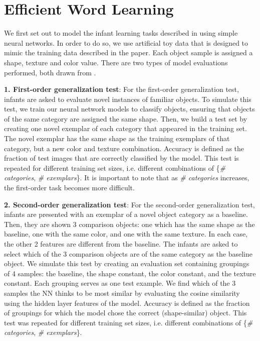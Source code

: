 \section{Efficient Word Learning}
\label{sec:efficient_learning}
We first set out to model the infant learning tasks described in \cite{Smith2002} using
simple neural networks. In order to do so, we use artificial toy data that is designed
to mimic the training data described in the paper. Each object sample is assigned a shape,
texture and color value. There are two types of model evaluations performed, both drawn from
\cite{Smith2002}.

{\bf1. First-order generalization test}: For the first-order generalization test, infants
are asked to evaluate novel instances of familiar objects. To simulate this test, we train
our neural network models to classify objects, ensuring that objects of the same category
are assigned the same shape. Then, we build a test set by creating one novel exemplar of
each category that appeared in the training set. The novel exemplar has the same
shape as the training exemplars of that category, but a new color and texture combination.
Accuracy is defined as the fraction of test images that are correctly classified by the model.
This test is repeated for different training set sizes, i.e. different combinations of
\{\textit{\# categories}, \textit{\# exemplars}\}. It is important to note that as
\textit{\# categories} increases, the first-order task becomes more difficult.

{\bf2. Second-order generalization test}: For the second-order generalization test, infants
are presented with an exemplar of a novel object category as a baseline. Then, they are
shown 3 comparison objects: one which has the same shape as the baseline, one with the same
color, and one with the same texture. In each case, the other 2 features are different from
the baseline. The infants are asked to select which of the 3 comparison objects are of the
same category as the baseline object. We simulate this test by creating an evaluation set
containing groupings of 4 samples: the baseline, the shape constant, the color constant, and
the texture constant. Each grouping serves as one test example. We find which of the 3
samples the NN thinks to be most similar by evaluating the cosine similarity using the
hidden layer features of the model. Accuracy is defined as the fraction of groupings for
which the model chose the correct (shape-similar) object. This test was repeated for
different training set sizes, i.e. different combinations of \{\textit{\# categories},
\textit{\# exemplars}\}.

